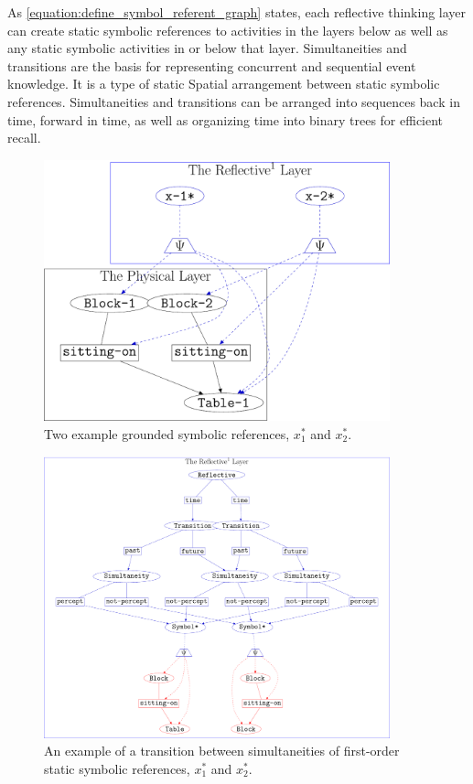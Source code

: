 As {\mbox{\autoref{equation:define_symbol_referent_graph}}} states,
each reflective thinking layer can create static symbolic references
to activities in the layers below as well as any static symbolic
activities in or below that layer.  Simultaneities and transitions are
the basis for representing concurrent and sequential event knowledge.
It is a type of static Spatial arrangement between static symbolic
references.  Simultaneities and transitions can be arranged into
sequences back in time, forward in time, as well as organizing time
into binary trees for efficient recall.
\begin{figure}
\center
\includegraphics[width=10cm]{gfx/two_example_grounded_symbolic_references}
\caption[Two example symbolic references.]{Two example grounded symbolic references, $x_1^*$ and $x_2^*$.}
\label{figure:two_example_grounded_symbolic_references}
\end{figure}
\begin{figure}
\center
\includegraphics[width=10cm]{gfx/example_transition}
\caption[An example of a transition between simultaneities.]{An
  example of a transition between simultaneities of first-order static
  symbolic references, $x_1^*$ and $x_2^*$.}
\label{figure:example_transition}
\end{figure}










